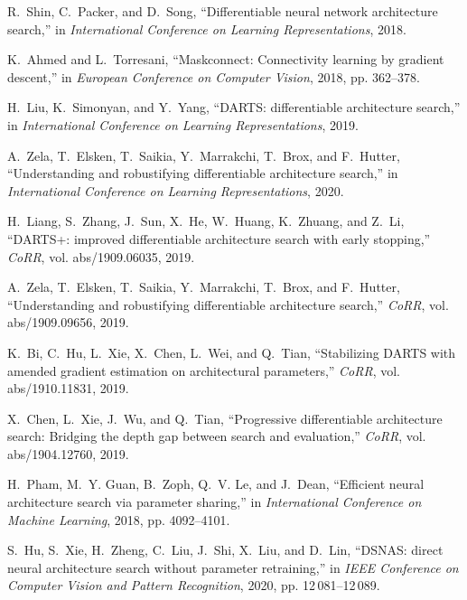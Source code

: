 \documentclass[journal]{IEEEtran}
\begin{document}
\begin{thebibliography}{10}
R.~Shin, C.~Packer, and D.~Song, ``Differentiable neural network architecture
  search,'' in \emph{International Conference on Learning Representations},
  2018.

K.~Ahmed and L.~Torresani, ``Maskconnect: Connectivity learning by gradient
  descent,'' in \emph{European Conference on Computer Vision}, 2018, pp.
  362--378.

H.~Liu, K.~Simonyan, and Y.~Yang, ``{DARTS:} differentiable architecture
  search,'' in \emph{International Conference on Learning Representations},
  2019.

A.~Zela, T.~Elsken, T.~Saikia, Y.~Marrakchi, T.~Brox, and F.~Hutter,
  ``Understanding and robustifying differentiable architecture search,'' in
  \emph{International Conference on Learning Representations}, 2020.

H.~Liang, S.~Zhang, J.~Sun, X.~He, W.~Huang, K.~Zhuang, and Z.~Li, ``{DARTS+:}
  improved differentiable architecture search with early stopping,''
  \emph{CoRR}, vol. abs/1909.06035, 2019.

A.~Zela, T.~Elsken, T.~Saikia, Y.~Marrakchi, T.~Brox, and F.~Hutter,
  ``Understanding and robustifying differentiable architecture search,''
  \emph{CoRR}, vol. abs/1909.09656, 2019.

K.~Bi, C.~Hu, L.~Xie, X.~Chen, L.~Wei, and Q.~Tian, ``Stabilizing {DARTS} with
  amended gradient estimation on architectural parameters,'' \emph{CoRR}, vol.
  abs/1910.11831, 2019.

X.~Chen, L.~Xie, J.~Wu, and Q.~Tian, ``Progressive differentiable architecture
  search: Bridging the depth gap between search and evaluation,'' \emph{CoRR},
  vol. abs/1904.12760, 2019.

H.~Pham, M.~Y. Guan, B.~Zoph, Q.~V. Le, and J.~Dean, ``Efficient neural
  architecture search via parameter sharing,'' in \emph{International
  Conference on Machine Learning}, 2018, pp. 4092--4101.

S.~Hu, S.~Xie, H.~Zheng, C.~Liu, J.~Shi, X.~Liu, and D.~Lin, ``{DSNAS:} direct
  neural architecture search without parameter retraining,'' in \emph{IEEE
  Conference on Computer Vision and Pattern Recognition}, 2020, pp.
  12\,081--12\,089.


\end{thebibliography}
\end{document}
